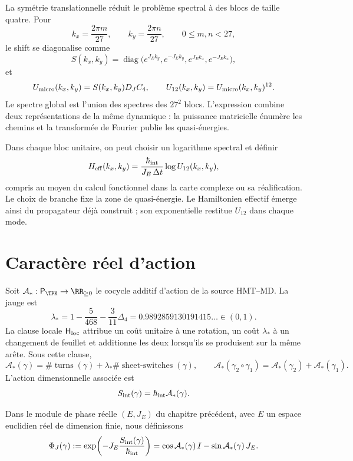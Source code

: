 La symétrie translationnelle réduit le problème spectral à des blocs de taille
quatre. Pour
\[
 k_x=\frac{2\pi m}{27},\qquad
 k_y=\frac{2\pi n}{27},
 \qquad 0\le m,n<27,
\]
le shift se diagonalise comme
\[
 S(k_x,k_y)=\operatorname{diag}
 \bigl(e^{J_Ek_y},e^{-J_Ek_y},e^{J_Ek_x},e^{-J_Ek_x}\bigr),
\]
et
\begin{equation}
 U_{\rm micro}(k_x,k_y)=S(k_x,k_y)D_JC_4,
 \qquad
 U_{12}(k_x,k_y)=U_{\rm micro}(k_x,k_y)^{12}.
 \label{eq:bloque-fourier-ledger-27}
\end{equation}
Le spectre global est l'union des spectres des \(27^2\) blocs.
L'expression combine deux représentations de la même dynamique : la puissance
matricielle énumère les chemins et la transformée de Fourier publie les
quasi-énergies.

Dans chaque bloc unitaire, on peut choisir un logarithme spectral et définir
\[
 H_{\rm eff}(k_x,k_y)
 =\frac{\hbar_{\rm int}}{J_E\,\Delta t}
   \log U_{12}(k_x,k_y),
\]
compris au moyen du calcul fonctionnel dans la carte complexe ou sa réalification.
Le choix de branche fixe la zone de quasi-énergie. Le Hamiltonien effectif
émerge ainsi du propagateur déjà construit ; son exponentielle restitue
\(U_{12}\) dans chaque mode.

\section{Caractère réel d'action}

Soit \(\mathcal A_*:\mathsf P_{\TPK}\to\RR_{\geq0}\) le cocycle additif
d'action de la source HMT--MD. La jauge est
\[
 \lambda_*
 =1-\frac5{468}-\frac3{11}\Delta_4
 =0.9892859130191415\ldots\in(0,1).
\]
La clause locale \(\mathsf H_{\rm loc}\) attribue un coût unitaire à une rotation,
un coût \(\lambda_*\) à un changement de feuillet et additionne les deux lorsqu'ils se produisent sur la
même arête. Sous cette clause,
\[
 \mathcal A_*(\gamma)
 =\#\operatorname{turns}(\gamma)
  +\lambda_*\#\operatorname{sheet\mbox{-}switches}(\gamma),
\qquad
 \mathcal A_*(\gamma_2\circ\gamma_1)
 =\mathcal A_*(\gamma_2)+\mathcal A_*(\gamma_1).
\]
L'action dimensionnelle associée est
\[
 S_{\rm int}(\gamma)=\hbar_{\rm int}\mathcal A_*(\gamma).
\]

Dans le module de phase réelle \((E,J_E)\) du chapitre précédent, avec \(E\) un
espace euclidien réel de dimension finie, nous définissons
\begin{equation}
 \Phi_J(\gamma)
 :=\exp\!\left(-J_E\frac{S_{\rm int}(\gamma)}{\hbar_{\rm int}}\right)
 =\cos\mathcal A_*(\gamma)\,I
  -\sin\mathcal A_*(\gamma)\,J_E.
 \label{eq:caracter-real-accion}
\end{equation}

